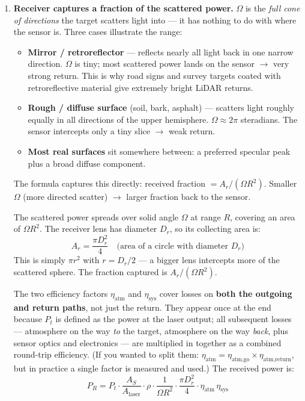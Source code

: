 \documentclass[12pt, a4paper]{article}
\begin{document}
\begin{enumerate}[leftmargin=1.6em,itemsep=4pt]
  \item \textbf{Receiver captures a fraction of the scattered power.}
    $\Omega$ is the \emph{full cone of directions} the target scatters light
    into --- it has nothing to do with where the sensor is.  Three cases
    illustrate the range:
    \begin{itemize}[leftmargin=1.2em,itemsep=2pt]
      \item \textbf{Mirror / retroreflector} --- reflects nearly all light
        back in one narrow direction.  $\Omega$ is tiny; most scattered power
        lands on the sensor $\to$ very strong return.  This is why road signs
        and survey targets coated with retroreflective material give extremely
        bright LiDAR returns.
      \item \textbf{Rough / diffuse surface} (soil, bark, asphalt) ---
        scatters light roughly equally in all directions of the upper
        hemisphere.  $\Omega \approx 2\pi$ steradians.  The sensor intercepts
        only a tiny slice $\to$ weak return.
      \item \textbf{Most real surfaces} sit somewhere between: a preferred
        specular peak plus a broad diffuse component.
    \end{itemize}
    The formula captures this directly: received fraction $= A_r /
    (\Omega R^2)$.  Smaller $\Omega$ (more directed scatter) $\to$ larger
    fraction back to the sensor.

    The scattered power spreads over solid angle $\Omega$ at range $R$,
    covering an area of $\Omega R^2$.
    The receiver lens has diameter $D_r$, so its collecting area is:
    \[
      A_r = \frac{\pi D_r^2}{4}
      \quad\text{(area of a circle with diameter } D_r\text{)}
    \]
    This is simply $\pi r^2$ with $r = D_r/2$ --- a bigger lens intercepts
    more of the scattered sphere.
    The fraction captured is $A_r / (\Omega R^2)$.

    The two efficiency factors $\eta_\text{atm}$ and $\eta_\text{sys}$ cover
    losses on \textbf{both the outgoing and return paths}, not just the
    return.  They appear once at the end because $P_t$ is defined as the
    power at the laser output; all subsequent losses --- atmosphere on the
    way \emph{to} the target, atmosphere on the way \emph{back}, plus sensor
    optics and electronics --- are multiplied in together as a combined
    round-trip efficiency.
    (If you wanted to split them: $\eta_\text{atm} = \eta_\text{atm,go}
    \times \eta_\text{atm,return}$, but in practice a single factor is
    measured and used.)
    The received power is:
    \[
      P_R = P_t \cdot \frac{A_S}{A_\text{laser}} \cdot \rho
            \cdot \frac{1}{\Omega R^2} \cdot \frac{\pi D_r^2}{4}
            \cdot \eta_\text{atm}\,\eta_\text{sys}
    \]
\end{enumerate}
\end{document}

